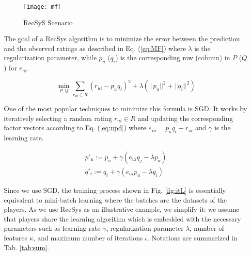 \documentclass[USenglish,oneside,twocolumn]{article}
\theoremstyle{plain}
\begin{document}
    \vspace{-0.25cm}
    \begin{figure}[h]
        \centering
        \texttt{[image: mf]}
        \caption{RecSyS Scenario}
        \label{fig:mf}
    \end{figure}
    \vspace{-0.25cm}
    
    The goal of a RecSys algorithm is to minimize the error between the prediction and the observed ratings as described in Eq. (\ref{eq:MF}) where $\lambda$ is the regularization parameter, while $p_u$ ($q_i$) is the corresponding row (column) in $P$ ($Q$) for $r_{ui}$.
    
    \vspace{-0.25cm}
    \begin{equation}
    \label{eq:MF}
    \min_{P,Q}\sum_{r_{ui}\in R}(r_{ui}-p_uq_i)^2+\lambda(||p_u||^2+||q_i||^2)
    \end{equation}
    
    One of the most popular techniques to minimize this formula is SGD. It works by iteratively selecting a random rating $r_{ui}\in R$ and updating the corresponding factor vectors according to Eq. (\ref{eq:upd}) where $e_{iu}=p_uq_i-r_{ui}$ and $\gamma$ is the learning rate.
    
    \vspace{-0.25cm}
    \begin{equation}
    \label{eq:upd}
    \begin{gathered}
    p'_{u}:=p_{u}+\gamma(e_{ui}q_{j}-\lambda p_{u})\\
    q'_{i}:=q_{i}+\gamma(e_{ui}p_{u}-\lambda q_{i})
    \end{gathered}
    \end{equation}
    
    Since we use SGD, the training process shown in Fig. \ref{fig:itL} is essentially equivalent to mini-batch learning where the batches are the datasets of the players. As we use RecSys as an illustrative example, we simplify it: we assume that players share the learning algorithm which is embedded with the necessary parameters such as learning rate $\gamma$, regularization parameter $\lambda$, number of features $\kappa$, and maximum number of iterations $\iota$. Notations are summarized in Tab. \ref{tab:sum}.
    
\end{document}
